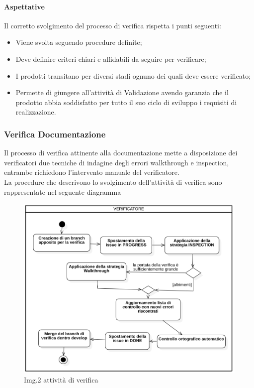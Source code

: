 			\paragraph{Aspettative}
				Il corretto svolgimento del processo di verifica rispetta i punti seguenti:\\
				\begin{itemize}
					\item  Viene svolta seguendo procedure definite;
					\item  Deve definire criteri chiari e affidabili da seguire per verificare;
					\item  I prodotti transitano per diversi stadi ognuno dei quali deve essere verificato;
					\item  Permette di giungere all’attività di Validazione avendo garanzia che il prodotto abbia soddisfatto per tutto il suo ciclo di sviluppo i requisiti di realizzazione.
				\end{itemize}
		\subsubsection{Verifica Documentazione}
			Il processo di verifica attinente alla documentazione mette a disposizione dei verificatori due tecniche di indagine degli errori walkthrough e inspection, entrambe richiedono l’intervento manuale del verificatore. \\
			La procedure che descrivono lo svolgimento dell’attività di verifica sono rappresentate nel seguente diagramma \\
			\begin{figure}[H]
    				\centering
    				\includegraphics[width=1.0\textwidth]{res/images/verifica}
				\caption{Img.2 attività di verifica}
				\label{fig:Img.2 attività di verifica}
			\end{figure}
